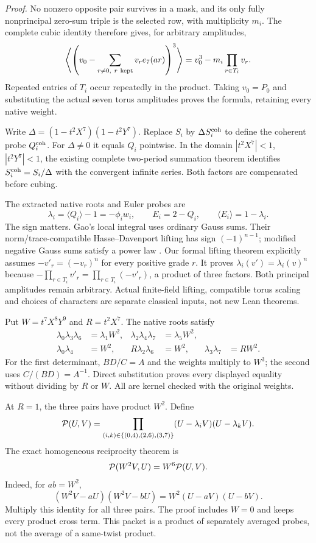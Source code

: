 \documentclass[11pt]{article}
\begin{document}
\emph{Proof.} No nonzero opposite pair survives in a mask, and its
only fully nonprincipal zero-sum triple is the selected row, with
multiplicity $m_i$. The complete cubic identity therefore gives,
for arbitrary amplitudes,
\[
 \left\langle
   \left(v_0-\sum_{r\ne0,\ r\ {\rm kept}}v_re_7(ar)\right)^3
 \right\rangle=v_0^3-m_i\prod_{r\in T_i}v_r .
\]
Repeated entries of $T_i$ occur repeatedly in the product.
Taking $v_0=P_0$ and substituting the actual seven torus amplitudes
proves the formula, retaining every native weight.

Write $\Delta=(1-t^2X^7)(1-t^2Y^7)$.
Replace $S_i$ by $\Delta S_i^{\rm coh}$ to define the coherent
probe $Q_i^{\rm coh}$. For $\Delta\ne0$ it equals $Q_i$
pointwise. In the domain $|t^2X^7|<1$, $|t^2Y^7|<1$, the
existing complete two-period summation theorem identifies
$S_i^{\rm coh}=S_i/\Delta$ with the convergent infinite series.
Both factors are compensated before cubing.

The extracted native roots and Euler probes are
\[
 \lambda_i=\langle Q_i\rangle-1=-\phi_iw_i,\qquad
 E_i=2-Q_i,\qquad \langle E_i\rangle=1-\lambda_i.
\]
The sign matters. Gao's local integral uses ordinary Gauss sums.
Their norm/trace-compatible Hasse--Davenport lifting has sign
$(-1)^{n-1}$; modified negative Gauss sums satisfy a power law
\cite[Proposition 2.12]{KubertLichtenbaum}.
Our formal lifting theorem explicitly assumes
$-v'_r=(-v_r)^n$ for every positive grade $r$.
It proves $\lambda_i(v')=\lambda_i(v)^n$ because
$-\prod_{r\in T_i}v'_r=\prod_{r\in T_i}(-v'_r)$, a product
of three factors. Both principal amplitudes remain arbitrary.
Actual finite-field lifting, compatible torus scaling and choices
of characters are separate classical inputs, not new Lean theorems.

Put $W=t^7X^8Y^9$ and $R=t^2X^7$. The native roots satisfy
\begin{align*}
 \lambda_0\lambda_3\lambda_6&=\lambda_1W^2,&
 \lambda_2\lambda_4\lambda_7&=\lambda_5W^2,\\
 \lambda_0\lambda_4&=W^2,&
 R\lambda_2\lambda_6&=W^2,&
 \lambda_3\lambda_7&=RW^2.
\end{align*}
For the first determinant, $BD/C=A$ and the weights multiply to
$W^3$; the second uses $C/(BD)=A^{-1}$. Direct substitution
proves every displayed equality without dividing by $R$ or $W$.
All are kernel checked with the original weights.

At $R=1$, the three pairs have product $W^2$. Define
\[
 {\cal P}(U,V)=
 \prod_{(i,k)\in\{(0,4),(2,6),(3,7)\}}
       (U-\lambda_iV)(U-\lambda_kV).
\]
The exact homogeneous reciprocity theorem is
\begin{equation}
 {\cal P}(W^2V,U)=W^6{\cal P}(U,V).
 \label{eq:native-packet-reciprocity}
\end{equation}
Indeed, for $ab=W^2$,
\[
 (W^2V-aU)(W^2V-bU)=W^2(U-aV)(U-bV).
\]
Multiply this identity for all three pairs. The proof includes
$W=0$ and keeps every product cross term. This packet is a
product of separately averaged probes, not the average of a
same-twist product.
\end{document}
